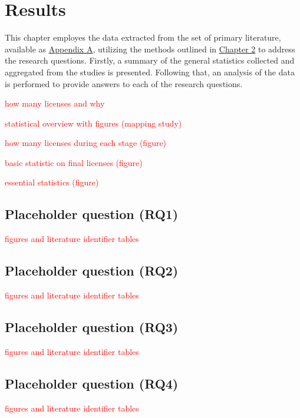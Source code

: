 \chapter{Results\label{results}}
This chapter employes the data extracted from the set of primary literature, available as \hyperref[appendix:a]{Appendix A}, utilizing the methods outlined in \hyperref[methods]{Chapter 2} to address the research questions. Firstly, a summary of the general statistics collected and aggregated from the studies is presented. Following that, an analysis of the data is performed to provide answers to each of the research questions.

\textcolor{red}{how many licenses and why}

\textcolor{red}{statistical overview with figures (mapping study)}

\textcolor{red}{how many licenses during each stage (figure)}

\textcolor{red}{basic statistic on final licenses (figure)}

\textcolor{red}{essential statistics (figure)}

\section{Placeholder question (RQ1)}
\textcolor{red}{figures and literature identifier tables}
\section{Placeholder question (RQ2)}
\textcolor{red}{figures and literature identifier tables}
\section{Placeholder question (RQ3)}
\textcolor{red}{figures and literature identifier tables}
\section{Placeholder question (RQ4)}
\textcolor{red}{figures and literature identifier tables}